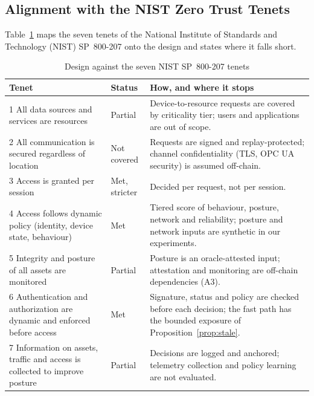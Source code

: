 \subsection{Alignment with the NIST Zero Trust Tenets}\label{sec:tenets}
Table~\ref{tab:tenets} maps the seven tenets of the National Institute of Standards and Technology (NIST) SP~800-207 \cite{nist800207} onto the design and states where it falls short.

\begin{table}[t]
\centering
\caption{Design against the seven NIST SP~800-207 tenets}
\label{tab:tenets}
\scriptsize
\begin{tabular}{@{}p{2.2cm}p{1.1cm}p{3.6cm}@{}}
\toprule
\textbf{Tenet} & \textbf{Status} & \textbf{How, and where it stops} \\
\midrule
1 All data sources and services are resources & Partial & Device-to-resource requests are covered by criticality tier; users and applications are out of scope. \\
2 All communication is secured regardless of location & Not covered & Requests are signed and replay-protected; channel confidentiality (TLS, OPC UA security) is assumed off-chain. \\
3 Access is granted per session & Met, stricter & Decided per request, not per session. \\
4 Access follows dynamic policy (identity, device state, behaviour) & Met & Tiered score of behaviour, posture, network and reliability; posture and network inputs are synthetic in our experiments. \\
5 Integrity and posture of all assets are monitored & Partial & Posture is an oracle-attested input; attestation and monitoring are off-chain dependencies (A3). \\
6 Authentication and authorization are dynamic and enforced before access & Met & Signature, status and policy are checked before each decision; the fast path has the bounded exposure of Proposition~\ref{prop:stale}. \\
7 Information on assets, traffic and access is collected to improve posture & Partial & Decisions are logged and anchored; telemetry collection and policy learning are not evaluated. \\
\bottomrule
\end{tabular}
\end{table}

